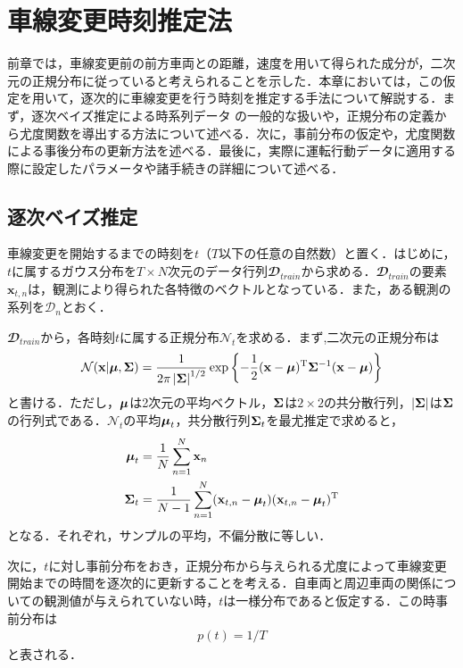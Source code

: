 \chapter{車線変更時刻推定法}
前章では，車線変更前の前方車両との距離，速度を用いて得られた成分が，二次元の正規分布に従っていると考えられることを示した．本章においては，この仮定を用いて，逐次的に車線変更を行う時刻を推定する手法について解説する．まず，逐次ベイズ推定による時系列データ%
の一般的な扱いや，正規分布の定義から尤度関数を導出する方法について述べる．次に，事前分布の仮定や，尤度関数による事後分布の更新方法を述べる．最後に，実際に運転行動データに適用する際に設定したパラメータや諸手続きの詳細について述べる．
\section{逐次ベイズ推定}
車線変更を開始するまでの時刻を$t$（$T$以下の任意の自然数）と置く．はじめに，$t$に属するガウス分布を$T\times N$次元のデータ行列$\mathbfcal{D}_\mathit{train}$から求める．$\mathbfcal{D}_\mathit{train}$の要素$\mathbf{x}_{t,n}$は，観測により得られた各特徴のベクトルとなっている．また，ある観測の系列を$\mathcal{D}_n$とおく．
\par
$\mathbfcal{D}_\mathit{train}$から，各時刻$t$に属する正規分布$\mathcal{N}_t$を求める．まず,二次元の正規分布は
\begin{align}
	\mathcal{N}(\mathbf{x}|\boldsymbol{\mu},\mathbf{\Sigma})=\frac{1}{2\pi\left|\mathbf{\Sigma}\right|^{1/2}}\exp\left\{-\frac{1}{2}(\mathbf{x}-\boldsymbol{\mu})^\mathrm{T}\mathbf{\Sigma}^{-1}(\mathbf{x}-\boldsymbol{\mu})\right\}
\end{align}
と書ける．ただし，$\boldsymbol{\mu}$は2次元の平均ベクトル，$\mathbf{\Sigma}$は$2\times2$の共分散行列，$\left|\mathbf{\Sigma}\right|$は$\mathbf{\Sigma}$の行列式である．$\mathcal{N}_t$の平均$\boldsymbol{\mu}_t$，共分散行列$\mathbf{\Sigma}_t$を最尤推定で求めると，
\begin{align}
	\boldsymbol{\mu}_t&=\frac{1}{N}\sum_{n=1}^N \mathbf{x}_n\\
	\mathbf{\Sigma}_t&=\frac{1}{N-1}\sum_{n=1}^N (\mathbf{x}_{t,n}-\boldsymbol{\mu}_t)(\mathbf{x}_{t,n}-\boldsymbol{\mu}_t)^\mathrm{T}
\end{align}
となる．それぞれ，サンプルの平均，不偏分散に等しい．
\par
次に，$t$に対し事前分布をおき，正規分布から与えられる尤度によって車線変更開始までの時間を逐次的に更新することを考える．自車両と周辺車両の関係についての観測値が与えられていない時，$t$は一様分布であると仮定する．この時事前分布は
\begin{align}
p(t)=1/T
\end{align}
と表される．
\par
